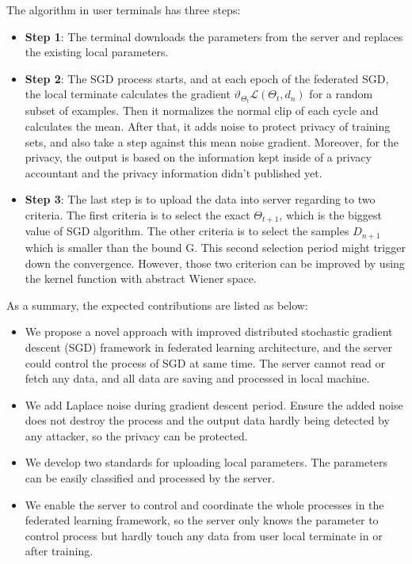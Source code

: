 \documentclass[journal,transmag]{IEEEtran}
\begin{document}
The algorithm in user terminals has three steps:
\begin{itemize}

 \item \textbf{Step 1}: The terminal downloads the parameters from the server and replaces the existing local parameters. 
    
\item \textbf{Step 2}: The SGD process starts, and at each epoch of the federated SGD, the local terminate calculates the gradient $\vartheta_{\Theta_t} \mathcal{L}(\Theta_t,d_n)$ for a random subset of examples. Then it normalizes the normal clip of each cycle and calculates the mean. After that, it adds noise to protect privacy of training sets, and also take a step against this mean noise gradient. Moreover, for the privacy, the output is based on the information kept inside of a privacy accountant and the privacy information didn’t published yet.
    
\item \textbf{Step 3}: The last step is to upload the data into server regarding to two criteria. The first criteria is to select the exact $\Theta_{t+1}$,  which is the biggest value of SGD algorithm. The other criteria is to select the samples $D_{n+1}$ which is smaller than the bound G. This second selection period might trigger down the convergence. However, those two criterion can be improved by using the kernel function with abstract Wiener space.
\end{itemize}
 
As a summary, the expected contributions are listed as below: 

\begin{itemize}
\item We propose a novel approach with improved distributed stochastic gradient descent (SGD) framework in federated learning architecture, and the server could control the process of SGD at same time. The server cannot read or fetch any data, and all data are saving and processed in local machine. 
\item We add Laplace noise during gradient descent period. Ensure the added noise does not destroy the process and the output data hardly being detected by any attacker, so the privacy can be protected.
\item We develop two standards for uploading local parameters. The parameters can be easily classified and processed by the server.
\item We enable the server to control and coordinate the whole processes in the federated learning framework, so the server only knows the parameter to control process but hardly touch any data from user local terminate in or after training. 
\end{itemize}
\end{document}
